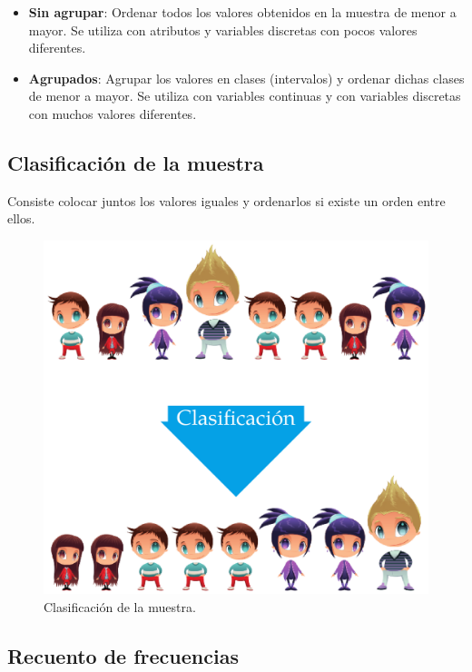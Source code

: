 \documentclass[
  a4paper,
]{scrreport}
\theoremstyle{plain}
\theoremstyle{definition}
\theoremstyle{definition}
\theoremstyle{remark}
\begin{document}
\begin{itemize}
\item
  \textbf{Sin agrupar}: Ordenar todos los valores obtenidos en la
  muestra de menor a mayor. Se utiliza con atributos y variables
  discretas con pocos valores diferentes.
\item
  \textbf{Agrupados}: Agrupar los valores en clases (intervalos) y
  ordenar dichas clases de menor a mayor. Se utiliza con variables
  continuas y con variables discretas con muchos valores diferentes.
\end{itemize}

\subsection{Clasificación de la
muestra}\label{clasificaciuxf3n-de-la-muestra}

Consiste colocar juntos los valores iguales y ordenarlos si existe un
orden entre ellos.

\begin{figure}[H]

{\centering \includegraphics{img/descriptiva/clasificacion_muestra.png}

}

\caption{Clasificación de la muestra.}

\end{figure}%

\subsection{Recuento de frecuencias}\label{recuento-de-frecuencias}
\end{document}
